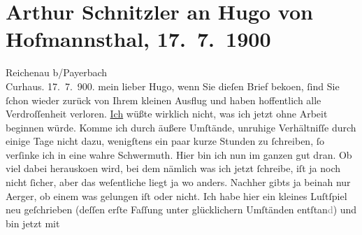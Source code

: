                \section[Arthur Schnitzler an Hugo von Hofmannsthal, 17. 7. 1900]{ Arthur Schnitzler an Hugo von Hofmannsthal, 17. 7. 1900}\nopagebreak{}\rehead{ }\begin{ledgroupsized}[t]{13cm}\normalsize\beginnumbering{} \toendnotes[C]{\smallbreak\pagebreak[2]} 
\toendnotes[C]{\smallbreak}\pstart
           \raggedleft{}{\pb}Reichenau b/Payerbach{\\}Curhaus.
                     17. 7. 900. \pend
           \pstart
           mein lieber Hugo, wenn Sie dieſen Brief beko{\geminationm}en, ſind Sie ſchon wieder zurück von Ihrem kleinen
               Ausflug und haben hoffentlich \introOben{}alle\introOben{} Verdroſſenheit verloren.
                  \uline{Ich} wüßte wirklich nicht, was ich jetzt ohne
               Arbeit beginnen würde. Komme ich durch äußere Umſtände, unruhige Verhältniſſe durch
               einige Tage nicht dazu, wenigſtens ein paar kurze Stunden zu ſchreiben, ſo verſinke
               ich in eine wahre Schwermuth. Hier bin ich nun im ganzen {\pb}gut dran. Ob viel dabei herausko{\geminationm}en wird, bei dem
               nämlich was ich jetzt ſchreibe, iſt ja noch nicht ſicher, aber das weſentliche liegt
               ja wo anders. Nachher gibts ja beinah nur Aerger, ob einem was gelungen iſt oder
               nicht. Ich habe hier ein kleines Luſtſpiel neu geſchrieben (deſſen erſte Faſſung \label{K_L01057-1v}\label{K_L01057-1h} unter glücklichern Umſtänden entſtan\textcolor{gray}{d}) und bin jetzt mit

\end{ledgroupsized}
